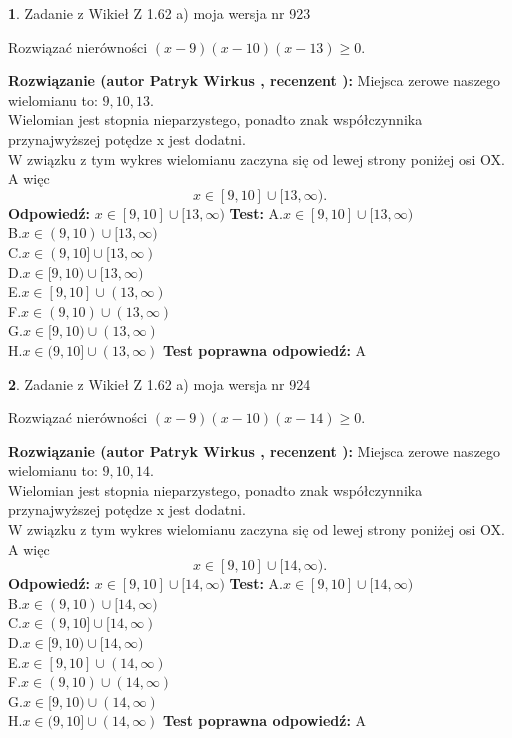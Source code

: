 \documentclass[12pt, a4paper]{article}
\theoremstyle{definition} %
\newtheorem{zad}{}
\newcommand{\zadStart}[1]{\begin{zad}#1\newline}
\newcommand{\zadStop}{\end{zad}}
\newcommand{\rozwStart}[2]{\noindent \textbf{Rozwiązanie (autor #1 , recenzent #2): }\newline}
\newcommand{\rozwStop}{\newline}
\newcommand{\odpStart}{\noindent \textbf{Odpowiedź:}\newline}
\newcommand{\odpStop}{\newline}
\newcommand{\testStart}{\noindent \textbf{Test:}\newline}
\newcommand{\testStop}{\newline}
\newcommand{\kluczStart}{\noindent \textbf{Test poprawna odpowiedź:}\newline}
\newcommand{\kluczStop}{\newline}
\begin{document}
\zadStart{Zadanie z Wikieł Z 1.62 a) moja wersja nr 923}

Rozwiązać nierówności $(x-9)(x-10)(x-13)\ge0$.
\zadStop
\rozwStart{Patryk Wirkus}{}
Miejsca zerowe naszego wielomianu to: $9, 10, 13$.\\
Wielomian jest stopnia nieparzystego, ponadto znak współczynnika przy\linebreak najwyższej potędze x jest dodatni.\\ W związku z tym wykres wielomianu zaczyna się od lewej strony poniżej osi OX. A więc $$x \in [9,10] \cup [13,\infty).$$
\rozwStop
\odpStart
$x \in [9,10] \cup [13,\infty)$
\odpStop
\testStart
A.$x \in [9,10] \cup [13,\infty)$\\
B.$x \in (9,10) \cup [13,\infty)$\\
C.$x \in (9,10] \cup [13,\infty)$\\
D.$x \in [9,10) \cup [13,\infty)$\\
E.$x \in [9,10] \cup (13,\infty)$\\
F.$x \in (9,10) \cup (13,\infty)$\\
G.$x \in [9,10) \cup (13,\infty)$\\
H.$x \in (9,10] \cup (13,\infty)$
\testStop
\kluczStart
A
\kluczStop



\zadStart{Zadanie z Wikieł Z 1.62 a) moja wersja nr 924}

Rozwiązać nierówności $(x-9)(x-10)(x-14)\ge0$.
\zadStop
\rozwStart{Patryk Wirkus}{}
Miejsca zerowe naszego wielomianu to: $9, 10, 14$.\\
Wielomian jest stopnia nieparzystego, ponadto znak współczynnika przy\linebreak najwyższej potędze x jest dodatni.\\ W związku z tym wykres wielomianu zaczyna się od lewej strony poniżej osi OX. A więc $$x \in [9,10] \cup [14,\infty).$$
\rozwStop
\odpStart
$x \in [9,10] \cup [14,\infty)$
\odpStop
\testStart
A.$x \in [9,10] \cup [14,\infty)$\\
B.$x \in (9,10) \cup [14,\infty)$\\
C.$x \in (9,10] \cup [14,\infty)$\\
D.$x \in [9,10) \cup [14,\infty)$\\
E.$x \in [9,10] \cup (14,\infty)$\\
F.$x \in (9,10) \cup (14,\infty)$\\
G.$x \in [9,10) \cup (14,\infty)$\\
H.$x \in (9,10] \cup (14,\infty)$
\testStop
\kluczStart
A
\kluczStop
\end{document}
